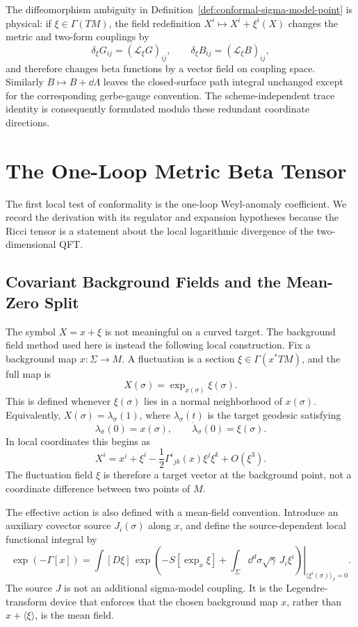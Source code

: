 The diffeomorphism ambiguity in
Definition~\ref{def:conformal-sigma-model-point} is physical: if
\(\xi\in\Gamma(TM)\), the field redefinition \(X^i\mapsto X^i+\xi^i(X)\)
changes the metric and two-form couplings by
\[
  \delta_\xi G_{ij}=(\mathcal L_\xi G)_{ij},
  \qquad
  \delta_\xi B_{ij}=(\mathcal L_\xi B)_{ij},
\]
and therefore changes beta functions by a vector field on coupling space.
Similarly \(B\mapsto B+\dd\Lambda\) leaves the closed-surface path integral
unchanged except for the corresponding gerbe-gauge convention.  The
scheme-independent trace identity is consequently formulated modulo these
redundant coordinate directions.

\section{The One-Loop Metric Beta Tensor}

The first local test of conformality is the one-loop Weyl-anomaly coefficient.
We record the derivation with its regulator and expansion hypotheses because
the Ricci tensor is a statement about the local logarithmic divergence of the
two-dimensional QFT.

\subsection{Covariant Background Fields and the Mean-Zero Split}
\label{subsec:nlsm-covariant-background-mean-zero}

The symbol \(X=x+\xi\) is not meaningful on a curved target.  The background
field method used here is instead the following local construction.  Fix a
background map \(x:\Sigma\to M\).  A fluctuation is a section
\(\xi\in\Gamma(x^*TM)\), and the full map is
\[
  X(\sigma)=\exp_{x(\sigma)}\xi(\sigma).
\]
This is defined whenever \(\xi(\sigma)\) lies in a normal neighborhood of
\(x(\sigma)\).
Equivalently, \(X(\sigma)=\lambda_\sigma(1)\), where
\(\lambda_\sigma(t)\) is the target geodesic satisfying
\[
  \lambda_\sigma(0)=x(\sigma),
  \qquad
  \dot\lambda_\sigma(0)=\xi(\sigma).
\]
In local coordinates this begins as
\begin{equation}
  X^i
  =
  x^i+\xi^i
  -\frac12\Gamma^i{}_{jk}(x)\xi^j\xi^k
  +O(\xi^3).
  \label{eq:nlsm-exponential-map-coordinate-expansion}
\end{equation}
The fluctuation field \(\xi\) is therefore a target vector at the
background point, not a coordinate difference between two points of \(M\).

The effective action is also defined with a mean-field convention.  Introduce
an auxiliary covector source \(J_i(\sigma)\) along \(x\), and define the
source-dependent local functional integral by
\begin{equation}
  \exp(-\Gamma[x])
  =
  \left.
  \int [D\xi]\,
  \exp\left(
    -S[\exp_x\xi]
    +
    \int_\Sigma \dd^d\sigma\sqrt\gamma\,J_i\xi^i
  \right)
  \right|_{\langle\xi^i(\sigma)\rangle_J=0}.
  \label{eq:nlsm-source-defined-effective-action}
\end{equation}
The source \(J\) is not an additional sigma-model coupling.  It is the
Legendre-transform device that enforces that the chosen background map
\(x\), rather than \(x+\langle\xi\rangle\), is the mean field.

